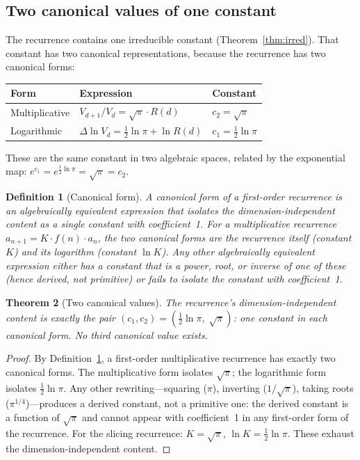 \documentclass[11pt,a4paper]{article}
\newtheorem{theorem}{Theorem}[section]
\newtheorem{definition}[theorem]{Definition}
\begin{document}
\subsection{Two canonical values of one constant}

The recurrence contains one irreducible constant
(Theorem~\ref{thm:irred}). That constant has two canonical
representations, because the recurrence has two canonical forms:

\begin{center}
\begin{tabular}{lll}
\toprule
Form & Expression & Constant \\
\midrule
Multiplicative & $V_{d+1}/V_d = \sqrt{\pi}\cdot R(d)$ &
$c_2 = \sqrt{\pi}$ \\
Logarithmic & $\Delta\ln V_d = \frac{1}{2}\ln\pi + \ln R(d)$ &
$c_1 = \frac{1}{2}\ln\pi$ \\
\bottomrule
\end{tabular}
\end{center}

These are the same constant in two algebraic spaces, related by the
exponential map: $e^{c_1} = e^{\frac{1}{2}\ln\pi} = \sqrt{\pi} = c_2$.

\begin{definition}[Canonical form]\label{def:canonical}
A canonical form of a first-order recurrence is an algebraically equivalent
expression that isolates the dimension-independent content as a single
constant with coefficient~1. For a multiplicative recurrence
$a_{n+1} = K\cdot f(n)\cdot a_n$, the two canonical forms are the
recurrence itself (constant $K$) and its logarithm (constant $\ln K$).
Any other algebraically equivalent expression either has a constant that
is a power, root, or inverse of one of these (hence derived, not
primitive) or fails to isolate the constant with coefficient~1.
\end{definition}

\begin{theorem}[Two canonical values]\label{thm:twovalues}
The recurrence's dimension-independent content is exactly the pair
$(c_1, c_2) = (\tfrac{1}{2}\ln\pi,\;\sqrt{\pi})$: one constant in each
canonical form. No third canonical value exists.
\end{theorem}

\begin{proof}
By Definition~\ref{def:canonical}, a first-order multiplicative recurrence
has exactly two canonical forms. The multiplicative form isolates
$\sqrt{\pi}$; the logarithmic form isolates $\frac{1}{2}\ln\pi$. Any
other rewriting---squaring ($\pi$), inverting ($1/\sqrt{\pi}$), taking
roots ($\pi^{1/4}$)---produces a derived constant, not a primitive one:
the derived constant is a function of $\sqrt{\pi}$ and cannot appear with
coefficient~1 in any first-order form of the recurrence. For the slicing
recurrence: $K = \sqrt{\pi}$, $\ln K = \frac{1}{2}\ln\pi$. These exhaust
the dimension-independent content.
\end{proof}
\end{document}
